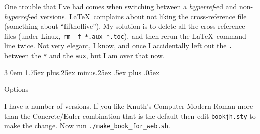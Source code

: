 \documentclass[titlepage]{article}
\makeatletter
\renewcommand{\subsubsection}{\@startsection{subsubsection}%
  {3}%
  {0em}%
  {1.75ex plus.25ex minus.25ex}%
  {.5ex plus .05ex}%
  {\bfseries\raggedright}}
\makeatother
\begin{document}
One trouble that I've had comes when switching between 
a \textit{hyperref}-ed and non-\textit{hyperref}-ed versions.
\LaTeX\ complains about not liking the cross-reference file
(something about ``fifthoffive'').
My solution is to delete all the cross-reference files 
(under Linux, \verb!rm -f *.aux *.toc!), 
and then rerun the \LaTeX\ command line twice.
Not very elegant, I know, and once I accidentally left out the 
\verb!.! between the \verb!*! and the \verb!aux!, but I am over that now.





\subsubsection{Options}

I have a number of versions.  
If you like Knuth's Computer Modern Roman more than the Concrete/Euler 
combination that is the default then edit
\verb!bookjh.sty! to make the change.
Now run \verb!./make_book_for_web.sh!.







\end{document}
